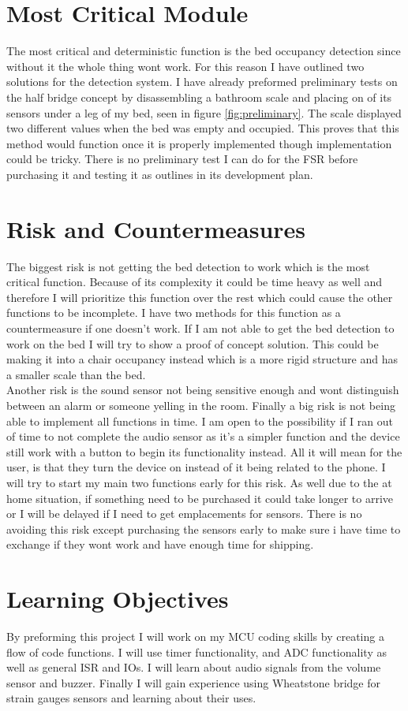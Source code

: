 \documentclass[11pt]{article}
\begin{document}
\section{Most Critical Module}
The most critical and deterministic function is the bed occupancy detection since without it the whole thing wont work.
For this reason I have outlined two solutions for the detection system.
I have already preformed preliminary tests on the half bridge concept by disassembling a bathroom scale and placing on of its sensors under a leg of my bed, seen in figure \ref{fig:preliminary}. 
The scale displayed two different values when the bed was empty and occupied. 
This proves that this method would function once it is properly implemented though implementation could be tricky. 
There is no preliminary test I can do for the FSR before purchasing it and testing it as outlines in its development plan.\\


\section{Risk and Countermeasures} \label{sec:risky}
The biggest risk is not getting the bed detection to work which is the most critical function. 
Because of its complexity it could be time heavy as well and therefore I will prioritize this function over the rest which could cause the other functions to be incomplete. 
I have two methods for this function as a countermeasure if one doesn't work. 
If I am not able to get the bed detection to work on the bed I will try to show a proof of concept solution. 
This could be making it into a chair occupancy instead which is a more rigid structure and has a smaller scale than the bed.  \\

Another risk is the sound sensor not being sensitive enough and wont distinguish between an alarm or someone yelling in the room.
Finally a big risk is not being able to implement all functions in time. 
I am open to the possibility if I ran out of time to not complete the audio sensor as it's a simpler function and the device still work with a button to begin its functionality instead.
All it will mean for the user, is that they turn the device on instead of it being related to the phone.  
I will try to start my main two functions early for this risk. 
As well due to the at home situation, if something need to be purchased it could take longer to arrive or I will be delayed if I need to get emplacements for sensors.
There is no avoiding this risk except purchasing the sensors early to make sure i have time to exchange if they wont work and have enough time for shipping.

\section{Learning Objectives}
By preforming this project I will work on my MCU coding skills by creating a flow of code functions.
I will use timer functionality, and ADC functionality as well as general ISR and IOs.
I will learn about audio signals from the volume sensor and buzzer. 
Finally I will gain experience using Wheatstone bridge for strain gauges sensors and learning about their uses. 
\end{document}
